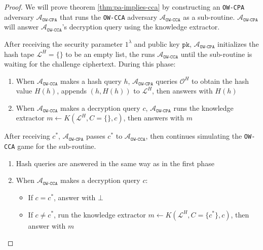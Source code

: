 \documentclass{article}
\newcommand{\monospace}{\texttt}
\newcommand{\pk}{\monospace{pk}}
\begin{document}
\begin{proof}
    We will prove theorem \ref{thm:pa-implies-cca} by constructing an \monospace{OW-CPA} adversary $\mathcal{A}_\monospace{OW-CPA}$ that runs the \monospace{OW-CCA} adversary $\mathcal{A}_\monospace{OW-CCA}$ as a sub-routine. $\mathcal{A}_\monospace{OW-CPA}$ will answer $\mathcal{A}_\monospace{OW-CCA}$'s decryption query using the knowledge extractor.

    After receiving the security parameter $1^\lambda$ and public key $\pk$, $\mathcal{A}_\monospace{OW-CPA}$ initializes the hash tape $\mathcal{L}^H = \{\}$ to be an empty list, the runs $\mathcal{A}_\monospace{OW-CCA}$ until the sub-routine is waiting for the challenge ciphertext. During this phase:

    \begin{enumerate}
        \item When $\mathcal{A}_\monospace{OW-CCA}$ makes a hash query $h$, $\mathcal{A}_\monospace{OW-CPA}$ queries $\mathcal{O}^H$ to obtain the hash value $H(h)$, appends $(h, H(h))$ to $\mathcal{L}^H$, then answers with $H(h)$
        \item When $\mathcal{A}_\monospace{OW-CCA}$ makes a decryption query $c$, $\mathcal{A}_\monospace{OW-CPA}$ runs the knowledge extractor $m \leftarrow K(\mathcal{L}^H, C = \{\}, c)$, then answers with $m$
    \end{enumerate}

    After receiving $c^\ast$, $\mathcal{A}_\monospace{OW-CPA}$ passes $c^\ast$ to $\mathcal{A}_\monospace{OW-CCA}$, then continues simulating the \monospace{OW-CCA} game for the sub-routine.

    \begin{enumerate}
        \item Hash queries are answered in the same way as in the first phase
        \item When $\mathcal{A}_\monospace{OW-CCA}$ makes a decryption query $c$: \begin{itemize}
            \item If $c = c^\ast$, answer with $\bot$
            \item If $c \neq c^\ast$, run the knowledge extractor $m \leftarrow K(\mathcal{L}^H, C = \{c^\ast\}, c)$, then answer with $m$
        \end{itemize}
    \end{enumerate}


\end{proof}
\end{document}
